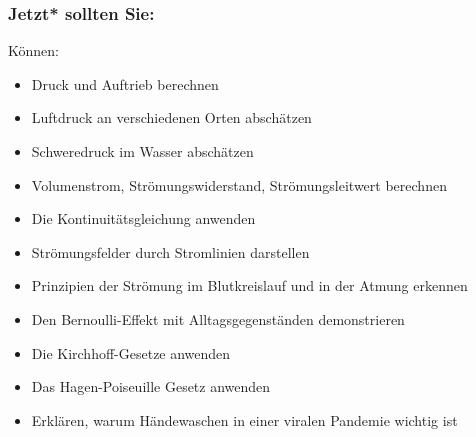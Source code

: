 \documentclass{beamer}
\begin{document}
\begin{frame}

\frametitle{Jetzt* sollten Sie:}
 



\begin{block}{Können:}
\begin{itemize}
\item
Druck und Auftrieb berechnen
\item
Luftdruck an verschiedenen Orten abschätzen
\item
Schweredruck im Wasser abschätzen
\item
Volumenstrom, Strömungswiderstand, Strömungsleitwert berechnen
\item
Die Kontinuitätsgleichung anwenden
\item
Strömungsfelder durch Stromlinien darstellen
\item
Prinzipien der Strömung im Blutkreislauf und in der Atmung erkennen
\item
Den Bernoulli-Effekt mit Alltagsgegenständen demonstrieren
\item
Die Kirchhoff-Gesetze anwenden
\item
Das Hagen-Poiseuille Gesetz anwenden
\item
Erklären, warum Händewaschen in einer viralen Pandemie wichtig ist
\end{itemize}
\end{block}

\end{frame}
\end{document}
